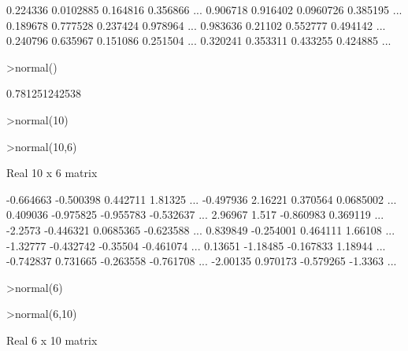 \documentclass{article}
\newenvironment{eulernotebook}{\par}{\par}
\begin{document}
\begin{eulernotebook}
\begin{euleroutput}
       0.224336     0.0102885      0.164816      0.356866     ...
       0.906718      0.916402     0.0960726      0.385195     ...
       0.189678      0.777528      0.237424      0.978964     ...
       0.983636       0.21102      0.552777      0.494142     ...
       0.240796      0.635967      0.151086      0.251504     ...
       0.320241      0.353311      0.433255      0.424885     ...
\end{euleroutput}
\begin{eulerprompt}
>normal()
\end{eulerprompt}
\begin{euleroutput}
  0.781251242538
\end{euleroutput}
\begin{eulerprompt}
>normal(10)
\end{eulerprompt}
\begin{euleroutput}
  [-1.34758,  0.750155,  -2.73261,  -0.82989,  1.79506,  0.655748,
  0.525446,  -0.151307,  1.5537,  0.138615]
\end{euleroutput}
\begin{eulerprompt}
>normal(10,6)
\end{eulerprompt}
\begin{euleroutput}
  Real 10 x 6 matrix
  
      -0.664663     -0.500398      0.442711       1.81325     ...
      -0.497936       2.16221      0.370564     0.0685002     ...
       0.409036     -0.975825     -0.955783     -0.532637     ...
        2.96967         1.517     -0.860983      0.369119     ...
        -2.2573     -0.446321     0.0685365     -0.623588     ...
       0.839849     -0.254001      0.464111       1.66108     ...
       -1.32777     -0.432742      -0.35504     -0.461074     ...
        0.13651      -1.18485     -0.167833       1.18944     ...
      -0.742837      0.731665     -0.263558     -0.761708     ...
       -2.00135      0.970173     -0.579265       -1.3363     ...
\end{euleroutput}
\begin{eulerprompt}
>normal(6)
\end{eulerprompt}
\begin{euleroutput}
  [-0.19087,  0.740958,  -0.245381,  -0.817244,  0.722786,  -1.42903]
\end{euleroutput}
\begin{eulerprompt}
>normal(6,10)
\end{eulerprompt}
\begin{euleroutput}
  Real 6 x 10 matrix
  

\end{euleroutput}
\end{eulernotebook}
\end{document}
